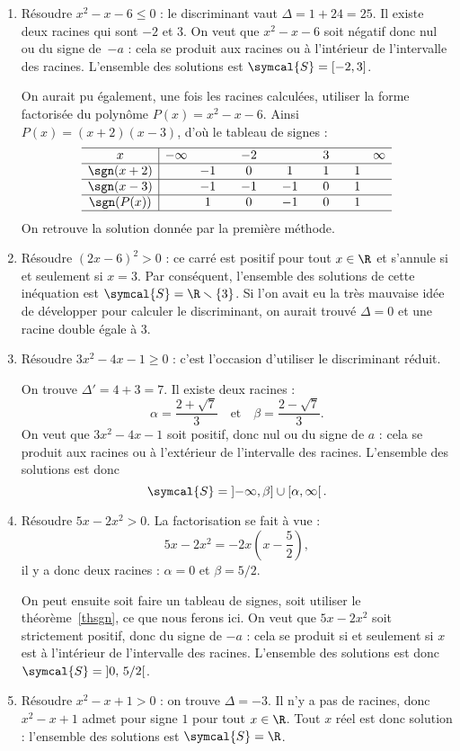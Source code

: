\begin{example}[Exemples]
\begin{enumerate}
\item Résoudre $x^2-x-6≤0$ : le discriminant vaut $\Delta=1+24=25$. Il existe deux racines qui sont $-2$ et $3$. On veut que $x^2-x-6$ soit négatif donc nul ou du signe de~$-a$ : cela se produit aux racines ou à l'intérieur de l'intervalle des racines. L'ensemble des solutions est $\symcal{S}=[-2,3]$.

On aurait pu également, une fois les racines calculées, utiliser la forme factorisée du polynôme $P(x)=x^2-x-6$. Ainsi $P(x)=(x+2)(x-3)$, d'où le tableau de signes :
\[\begin{array}{c|ccccccc}
\hline
x&-\infty&&\quad-2\quad&&\quad3\quad&&\infty\\
\hline
\sgn(x+2)&&-1&0&1&1&1&\\
\hline
\sgn(x-3)&&-1&-1&-1&0&1&\\
\hline
\sgn(P(x))&&1&0&-1&0&1&\\
\hline
\end{array}
\]
On retrouve la solution donnée par la première méthode.

\item Résoudre $(2x-6)^2>0$ : ce carré est positif pour tout $x\in\R$ et s'annule si et seulement si $x=3$. Par conséquent, l'ensemble des solutions de cette inéquation est $\symcal{S}=\R\smallsetminus\{3\}$. Si l'on avait eu la très mauvaise idée de développer pour calculer le discriminant, on aurait trouvé $\Delta=0$ et une racine double égale à $3$.
\item Résoudre $3x^2-4x-1≥0$ : c'est l'occasion d'utiliser le discriminant réduit.

On trouve $\Delta'=4+3=7$.
Il existe deux racines :
\[
\alpha=\frac{2+\sqrt{7}}{3}\quad\text{et}\quad\beta=\frac{2-\sqrt{7}}{3}.
\]
On veut que $3x^2-4x-1$ soit positif, donc nul ou du signe de $a$ : cela se produit aux racines ou à l'extérieur de l'intervalle des racines. L'ensemble des solutions est donc
\[
\symcal{S}=\left]-\infty, \beta\right] \cup \left[\alpha, \infty\right[.
\]
\item Résoudre $5x-2x^2>0$. La factorisation se fait à vue : 
\[
5x-2x^2=-2x\left(x-\frac52\right),
\]
 il y a donc deux racines : $\alpha=0$ et $\beta=5/2$.

On peut ensuite soit faire un tableau de signes, soit utiliser le théorème \ref{thsgn}, ce que nous ferons ici.
On veut que $5x-2x^2$ soit strictement positif,  donc du signe de $-a$ : cela se produit si et seulement si $x$ est à l'intérieur de l'intervalle des racines. L'ensemble des solutions est donc 
$\symcal{S}=\left]0,\, 5/2\right[$.
\item Résoudre $x^2-x+1>0$ : on trouve $\Delta=-3$. Il n'y a pas de racines, donc $x^2-x+1$ admet pour signe $1$ pour tout $x\in\R$. Tout $x$ réel est donc solution : l'ensemble des solutions est $\symcal{S}=\R$. 
\end{enumerate}
\end{example}
